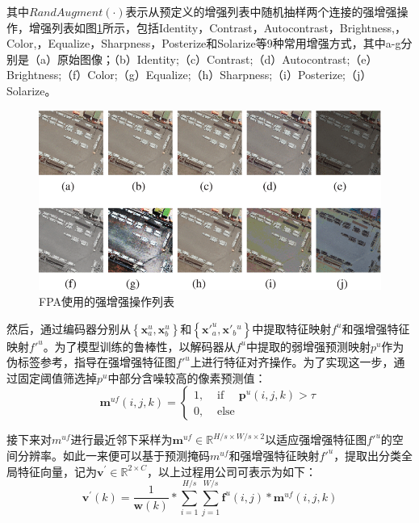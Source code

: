 \documentclass[lang=chs, degree=master, blindreview=false, adobe=false]{yanputhesis}
\begin{document}
其中$RandAugment(\cdot)$表示从预定义的增强列表中随机抽样两个连接的强增强操作，增强列表如图\ref{fig:FPAstrongAug}所示，包括Identity，Contrast，Autocontrast，Brightness,，Color,，Equalize，Sharpness，Posterize和Solarize等9种常用增强方式，其中a-g分别是（a）原始图像；（b）Identity;（c）Contrast;（d）Autocontrast;（e）Brightness;（f）Color;（g）Equalize;（h）Sharpness;（i）Posterize;（j）Solarize。
\begin{figure}[htb]
  \centering
  \includegraphics[scale=0.55]{images/Strong_aug.png}
  \caption{
    FPA使用的强增强操作列表\cite{Zhang2023FPA}
  }
  \label{fig:FPAstrongAug}
\end{figure}

然后，通过编码器分别从$\left\{\mathbf{x}_{a}^{u}, \mathbf{x}_{b}^{u}\right\}$和$\left\{\mathbf{x'}_{a}^{u}, \mathbf{x'}_{b}{ }^{u}\right\}$中提取特征映射$f^u$和强增强特征映射$f'^u$。为了模型训练的鲁棒性，以解码器从$f^u$中提取的弱增强预测映射$p^u$作为伪标签参考，指导在强增强特征图$f'^u$上进行特征对齐操作。为了实现这一步，通过固定阈值筛选掉$p^u$中部分含噪较高的像素预测值：
\begin{equation}
  \label{eq:FPAthresh}
  \mathbf{m}^{u f}(i, j, k)=\left\{\begin{array}{ll}
    1, & \text { if } \quad \mathbf{p}^{u}(i, j, k)>\tau \\
    0, & \text { else }
    \end{array}\right.
\end{equation}

接下来对$m^{u f}$进行最近邻下采样为$\mathbf{m}^{u f} \in \mathbb{R}^{H / s \times W / s \times 2}$以适应强增强特征图$f'^u$的空间分辨率。如此一来便可以基于预测掩码$m^{u f}$和强增强特征映射$f'^u$，提取出分类全局特征向量，记为$\mathbf{v}^{\prime} \in \mathbb{R}^{2 \times C}$，以上过程用公司可表示为如下：
\begin{equation}
  \label{eq:FPAmetafeat}
  \mathbf{v}^{\prime}(k)=\frac{1}{\boldsymbol{w}(k)} * \sum_{i=1}^{H / s} \sum_{j=1}^{W / s} \mathbf{f}^{u}(i, j) * \mathbf{m}^{u f}(i, j, k)
\end{equation}
\end{document}
